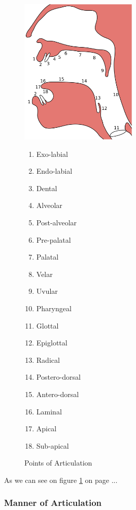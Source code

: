 \documentclass[12pt]{book}
\begin{document}
\begin{figure}[h]
	\caption{Points of Articulation}
	\centering
		\includegraphics[width=0.5\textwidth]{Places_of_articulation.png}
		\begin{multicols}{3}
			\begin{enumerate}
				\item Exo-labial
				\item Endo-labial
				\item Dental
				\item Alveolar
				\item Post-alveolar
				\item Pre-palatal
				\item Palatal
				\item Velar
				\item Uvular
				\item Pharyngeal
				\item Glottal
				\item Epiglottal
				\item Radical
				\item Postero-dorsal
				\item Antero-dorsal
				\item Laminal
				\item Apical
				\item Sub-apical
			\end{enumerate}
		\end{multicols}
	\label{figure:PointsOfArticulation}
\end{figure}


As we can see on figure \ref{figure:PointsOfArticulation} on page \pageref{figure:PointsOfArticulation} ...

\subsubsection{Manner of Articulation}
\end{document}
